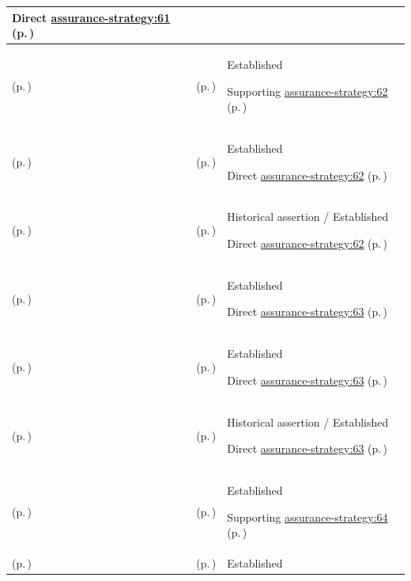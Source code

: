 \begin{longtable}{|>{\raggedright\arraybackslash}p{0.27\TableWidth}|>{\raggedright\arraybackslash}p{0.27\TableWidth}|>{\raggedright\arraybackslash}p{0.46\TableWidth}|}
Direct \hyperref[rad:assurance-strategy:58]{assurance-strategy:61} (p.\,\pageref{rad:assurance-strategy:58})\\\hline
\nameref{cap:bec-assurance-design} (p.\,\pageref{cap:bec-assurance-design}) & \nameref{cap:ec-03} (p.\,\pageref{cap:ec-03}) & Established

Supporting \hyperref[rad:assurance-strategy:58]{assurance-strategy:62} (p.\,\pageref{rad:assurance-strategy:58})\\\hline
\nameref{cap:bec-assurance-criteria-management} (p.\,\pageref{cap:bec-assurance-criteria-management}) & \nameref{cap:ec-03} (p.\,\pageref{cap:ec-03}) & Established

Direct \hyperref[rad:assurance-strategy:58]{assurance-strategy:62} (p.\,\pageref{rad:assurance-strategy:58})\\\hline
\nameref{cap:bec-governed-assurance} (p.\,\pageref{cap:bec-governed-assurance}) & \nameref{cap:ec-03} (p.\,\pageref{cap:ec-03}) & Historical assertion / Established

Direct \hyperref[rad:assurance-strategy:58]{assurance-strategy:62} (p.\,\pageref{rad:assurance-strategy:58})\\\hline
\nameref{cap:bec-assurance-design} (p.\,\pageref{cap:bec-assurance-design}) & \nameref{cap:ec-04} (p.\,\pageref{cap:ec-04}) & Established

Direct \hyperref[rad:assurance-strategy:58]{assurance-strategy:63} (p.\,\pageref{rad:assurance-strategy:58})\\\hline
\nameref{cap:bec-assurance-criteria-management} (p.\,\pageref{cap:bec-assurance-criteria-management}) & \nameref{cap:ec-04} (p.\,\pageref{cap:ec-04}) & Established

Direct \hyperref[rad:assurance-strategy:58]{assurance-strategy:63} (p.\,\pageref{rad:assurance-strategy:58})\\\hline
\nameref{cap:bec-governed-assurance} (p.\,\pageref{cap:bec-governed-assurance}) & \nameref{cap:ec-04} (p.\,\pageref{cap:ec-04}) & Historical assertion / Established

Direct \hyperref[rad:assurance-strategy:58]{assurance-strategy:63} (p.\,\pageref{rad:assurance-strategy:58})\\\hline
\nameref{cap:bec-assurance-design} (p.\,\pageref{cap:bec-assurance-design}) & \nameref{cap:ec-05} (p.\,\pageref{cap:ec-05}) & Established

Supporting \hyperref[rad:assurance-strategy:58]{assurance-strategy:64} (p.\,\pageref{rad:assurance-strategy:58})\\\hline
\nameref{cap:bec-assurance-criteria-management} (p.\,\pageref{cap:bec-assurance-criteria-management}) & \nameref{cap:ec-05} (p.\,\pageref{cap:ec-05}) & Established


\end{longtable}
